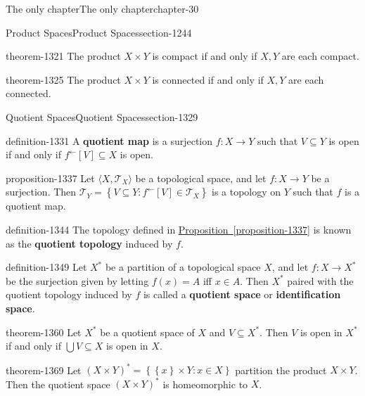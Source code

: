 \documentclass[oneside,10pt,]{book}
\newcommand{\terminology}[1]{\textbf{#1}}
\newcommand{\tuple}[1]{\langle #1 \rangle}
\newcommand{\mc}{\mathcal}
\newcommand{\setBuilder}[2]{\left\{#1:#2\right\}}
\newcommand{\setList}[1]{\left\{#1\right\}}
\begin{document}
\begin{chapterptx}{The only chapter}{}{The only chapter}{}{}{chapter-30}
\begin{sectionptx}{Product Spaces}{}{Product Spaces}{}{}{section-1244}
\begin{theorem}{}{}{theorem-1321}
\hypertarget{p-1322}{}%
The product \(X\times Y\) is compact if and only if \(X,Y\) are each compact.%
\end{theorem}
\begin{theorem}{}{}{theorem-1325}%
\hypertarget{p-1326}{}%
The product \(X\times Y\) is connected if and only if \(X,Y\) are each connected.%
\end{theorem}
\end{sectionptx}
%
%
\typeout{************************************************}
\typeout{************************************************}
%
\begin{sectionptx}{Quotient Spaces}{}{Quotient Spaces}{}{}{section-1329}
\begin{definition}{}{definition-1331}%
\hypertarget{p-1332}{}%
A \terminology{quotient map} is a surjection \(f:X\to Y\) such that \(V\subseteq Y\) is open if and only if \(f^\leftarrow[V]\subseteq X\) is open.%
\end{definition}
\begin{proposition}{}{}{proposition-1337}%
\hypertarget{p-1338}{}%
Let \(\tuple{X,\mc T_X}\) be a topological space, and let \(f:X\to Y\) be a surjection. Then \(\mc T_Y=\setBuilder{V\subseteq Y}{f^\leftarrow[V]\in\mc T_X}\) is a topology on \(Y\) such that \(f\) is a quotient map.%
\end{proposition}
\begin{definition}{}{definition-1344}%
\hypertarget{p-1345}{}%
The topology defined in \hyperref[proposition-1337]{Proposition~\ref{proposition-1337}} is known as the \terminology{quotient topology} induced by \(f\).%
\end{definition}
\begin{definition}{}{definition-1349}%
\hypertarget{p-1350}{}%
Let \(X^*\) be a partition of a topological space \(X\), and let \(f:X\to X^*\) be the surjection given by letting \(f(x)=A\) iff \(x\in A\). Then \(X^*\) paired with the quotient topology induced by \(f\) is called a \terminology{quotient space} or \terminology{identification space}.%
\end{definition}
\begin{theorem}{}{}{theorem-1360}%
\hypertarget{p-1361}{}%
Let \(X^*\) be a quotient space of \(X\) and \(V\subseteq X^*\). Then \(V\) is open in \(X^*\) if and only if \(\bigcup V\subseteq X\) is open in \(X\).%
\end{theorem}
\begin{theorem}{}{}{theorem-1369}%
\hypertarget{p-1370}{}%
Let \((X\times Y)^*=\setBuilder{\setList{x}\times Y}{x\in X}\) partition the product \(X\times Y\). Then the quotient space \((X\times Y)^*\) is homeomorphic to \(X\).%

\end{theorem}
\end{sectionptx}
\end{chapterptx}
\end{document}
